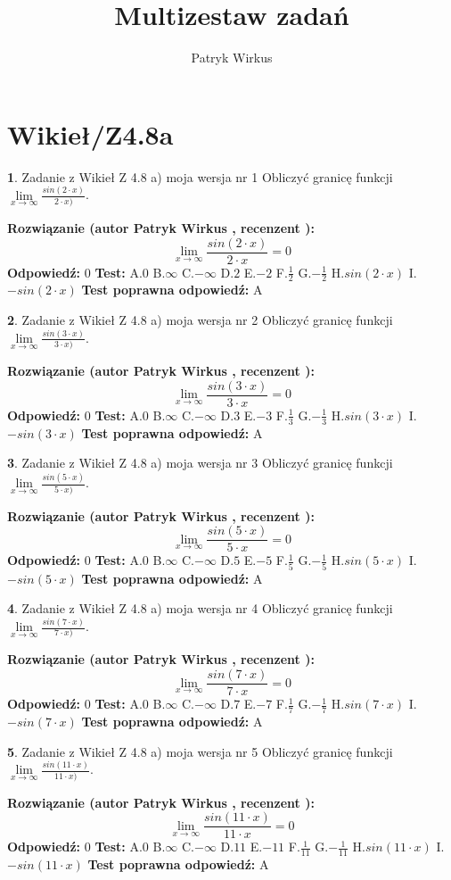 \documentclass[12pt, a4paper]{article}
\title{Multizestaw zadań}
\author{Patryk Wirkus}
\date{}
\theoremstyle{definition} %
\newtheorem{zad}{}
\newcommand{\kategoria}[1]{\section{#1}}
\newcommand{\zadStart}[1]{\begin{zad}#1\newline}
\newcommand{\zadStop}{\end{zad}}
\newcommand{\rozwStart}[2]{\noindent \textbf{Rozwiązanie (autor #1 , recenzent #2): }\newline}
\newcommand{\rozwStop}{\newline}
\newcommand{\odpStart}{\noindent \textbf{Odpowiedź:}\newline}
\newcommand{\odpStop}{\newline}
\newcommand{\testStart}{\noindent \textbf{Test:}\newline}
\newcommand{\testStop}{\newline}
\newcommand{\kluczStart}{\noindent \textbf{Test poprawna odpowiedź:}\newline}
\newcommand{\kluczStop}{\newline}
\begin{document}
\maketitle

\kategoria{Wikieł/Z4.8a}


\zadStart{Zadanie z Wikieł Z 4.8 a) moja wersja nr 1}
Obliczyć granicę funkcji $\lim\limits_{x\to \infty}\frac{sin(2\cdot x)}{2\cdot x)}$.
\zadStop
\rozwStart{Patryk Wirkus}{}
$$\lim\limits_{x\to \infty}\frac{sin(2\cdot x)}{2\cdot x}=
0$$
\rozwStop
\odpStart
$0$
\odpStop
\testStart
A.$0$ B.$\infty$ C.$-\infty$ D.$2$ E.$-2$
F.$\frac{1}{2}$ G.$-\frac{1}{2}$
H.$sin(2\cdot x)$
I.$-sin(2\cdot x)$
\testStop
\kluczStart
A
\kluczStop



\zadStart{Zadanie z Wikieł Z 4.8 a) moja wersja nr 2}
Obliczyć granicę funkcji $\lim\limits_{x\to \infty}\frac{sin(3\cdot x)}{3\cdot x)}$.
\zadStop
\rozwStart{Patryk Wirkus}{}
$$\lim\limits_{x\to \infty}\frac{sin(3\cdot x)}{3\cdot x}=
0$$
\rozwStop
\odpStart
$0$
\odpStop
\testStart
A.$0$ B.$\infty$ C.$-\infty$ D.$3$ E.$-3$
F.$\frac{1}{3}$ G.$-\frac{1}{3}$
H.$sin(3\cdot x)$
I.$-sin(3\cdot x)$
\testStop
\kluczStart
A
\kluczStop



\zadStart{Zadanie z Wikieł Z 4.8 a) moja wersja nr 3}
Obliczyć granicę funkcji $\lim\limits_{x\to \infty}\frac{sin(5\cdot x)}{5\cdot x)}$.
\zadStop
\rozwStart{Patryk Wirkus}{}
$$\lim\limits_{x\to \infty}\frac{sin(5\cdot x)}{5\cdot x}=
0$$
\rozwStop
\odpStart
$0$
\odpStop
\testStart
A.$0$ B.$\infty$ C.$-\infty$ D.$5$ E.$-5$
F.$\frac{1}{5}$ G.$-\frac{1}{5}$
H.$sin(5\cdot x)$
I.$-sin(5\cdot x)$
\testStop
\kluczStart
A
\kluczStop



\zadStart{Zadanie z Wikieł Z 4.8 a) moja wersja nr 4}
Obliczyć granicę funkcji $\lim\limits_{x\to \infty}\frac{sin(7\cdot x)}{7\cdot x)}$.
\zadStop
\rozwStart{Patryk Wirkus}{}
$$\lim\limits_{x\to \infty}\frac{sin(7\cdot x)}{7\cdot x}=
0$$
\rozwStop
\odpStart
$0$
\odpStop
\testStart
A.$0$ B.$\infty$ C.$-\infty$ D.$7$ E.$-7$
F.$\frac{1}{7}$ G.$-\frac{1}{7}$
H.$sin(7\cdot x)$
I.$-sin(7\cdot x)$
\testStop
\kluczStart
A
\kluczStop



\zadStart{Zadanie z Wikieł Z 4.8 a) moja wersja nr 5}
Obliczyć granicę funkcji $\lim\limits_{x\to \infty}\frac{sin(11\cdot x)}{11\cdot x)}$.
\zadStop
\rozwStart{Patryk Wirkus}{}
$$\lim\limits_{x\to \infty}\frac{sin(11\cdot x)}{11\cdot x}=
0$$
\rozwStop
\odpStart
$0$
\odpStop
\testStart
A.$0$ B.$\infty$ C.$-\infty$ D.$11$ E.$-11$
F.$\frac{1}{11}$ G.$-\frac{1}{11}$
H.$sin(11\cdot x)$
I.$-sin(11\cdot x)$
\testStop
\kluczStart
A
\kluczStop
\end{document}
